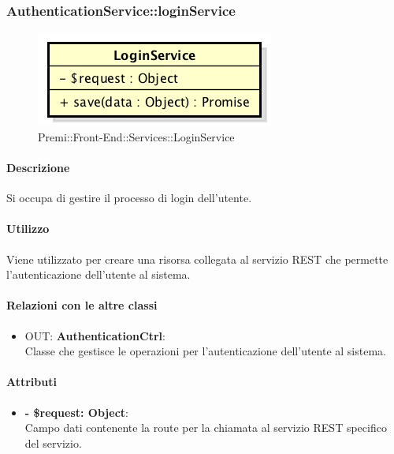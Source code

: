 		
		\subsubsection{AuthenticationService::loginService}
		\begin{figure}[h]
			\centering
				\includegraphics[width=0.4\linewidth]{img/premi_front_end_services_loginservice}
			\caption[Premi::Front-End::Services::LoginService]{Premi::Front-End::Services::LoginService}
		\end{figure}
		
		\paragraph{Descrizione}
		Si occupa di gestire il processo di login dell'utente.
		
		\paragraph{Utilizzo}
		Viene utilizzato per creare una risorsa collegata al servizio \gls{REST} che permette l'autenticazione dell'utente al sistema.
		
		\paragraph{Relazioni con le altre classi}
		\begin{itemize}
			\item OUT: \textbf{AuthenticationCtrl}:\\
			Classe che gestisce le operazioni per l'autenticazione dell'utente al sistema.
		\end{itemize}
		
		\paragraph{Attributi}
		\begin{itemize}
			\item \textbf{- \$request: Object}:\\
			Campo dati contenente la route per la chiamata al servizio \gls{REST} specifico del servizio.
		\end{itemize}	
		
